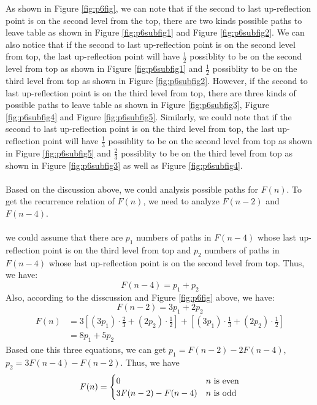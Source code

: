 As shown in Figure \ref{fig:p6fig}, we can note that if the second to last up-reflection point is on the second level from the top, there are two kinds possible paths to leave table as shown in Figure \ref{fig:p6subfig1} and Figure \ref{fig:p6subfig2}. We can also notice that if the second to last up-reflection point is on the second level from top, the last up-reflection point will have $\frac{1}{2}$ possiblity to be on the second level from top as shown in Figure \ref{fig:p6subfig1} and $\frac{1}{2}$ possiblity to be on the third level from top as shown in Figure \ref{fig:p6subfig2}. However, if the second to last up-reflection point is on the third level from top, there are three kinds of possible paths to leave table as shown in Figure \ref{fig:p6subfig3}, Figure \ref{fig:p6subfig4} and Figure \ref{fig:p6subfig5}. Similarly, we could note that if the second to last up-reflection point is on the third level from top, the last up-reflection point will have $\frac{1}{3}$ possiblity to be on the second level from top as shown in Figure \ref{fig:p6subfig5} and $\frac{2}{3}$ possiblity to be on the third level from top as shown in Figure \ref{fig:p6subfig3} as well as Figure \ref{fig:p6subfig4}.\\\\

Based on the discussion above, we could analysis possible paths for $F(n)$. To get the recurrence relation of $F(n)$, we need to analyze $F(n - 2)$ and $F(n - 4)$. \\\\
we could assume that there are $p_1$ numbers of paths in $F(n - 4)$ whose last up-reflection point is on the third level from top and $p_2$ numbers of paths in $F(n - 4)$ whose last up-reflection point is on the second level from top. Thus, we have:
$$ F(n - 4) = p_1 + p_2 $$
Also, according to the disscussion and Figure \ref{fig:p6fig} above, we have:
$$ F(n - 2) = 3p_1 + 2p_2 $$
\begin{align*}
F(n) &= 3[(3p_1)\cdot \frac{2}{3} + (2p_2)\cdot \frac{1}{2}] + [(3p_1)\cdot \frac{1}{3} + (2p_2)\cdot \frac{1}{2}]\\
&= 8p_1 + 5p_2
\end{align*}
Based one this three equations, we can get $p_1 = F(n - 2) - 2F(n - 4)$, $p_2 = 3F(n - 4) - F(n - 2)$.
Thus, we have
\begin{align*}
F(n) = 
\begin{cases}
0 & n $ is even$\\
3F(n - 2) - F(n - 4) & n $ is odd$
\end{cases}
\end{align*}


